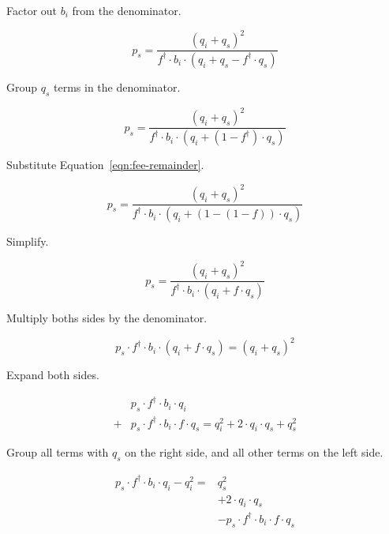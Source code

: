 Factor out $b_i$ from the denominator.

\begin{equation*}
  p_s = \frac{(q_i + q_s)^2}{f^{\dagger} \cdot b_i \cdot
  \left(q_i + q_s - f^{\dagger} \cdot q_s\right)}
\end{equation*}

Group $q_s$ terms in the denominator.

\begin{equation*}
  p_s = \frac{(q_i + q_s)^2}{f^{\dagger} \cdot b_i \cdot
  \left(q_i + (1 - f^{\dagger}) \cdot q_s \right)}
\end{equation*}

Substitute Equation~\ref{eqn:fee-remainder}.

\begin{equation*}
  p_s = \frac{(q_i + q_s)^2}{f^{\dagger} \cdot b_i \cdot
  \left(q_i + (1 - (1 - f)) \cdot q_s \right)}
\end{equation*}

Simplify.

\begin{equation*}
  p_s = \frac{(q_i + q_s)^2}{f^{\dagger} \cdot b_i \cdot
  \left(q_i + f \cdot q_s \right)}
\end{equation*}

Multiply boths sides by the denominator.

\begin{equation*}
  p_s \cdot f^{\dagger} \cdot b_i \cdot (q_i + f \cdot q_s) = {(q_i + q_s)}^2
\end{equation*}

Expand both sides.

\begin{equation}
	\begin{aligned}
		      & p_s \cdot f^{\dagger} \cdot b_i \cdot q_i           \\
		{}+{} & p_s \cdot f^{\dagger} \cdot b_i \cdot f \cdot q_s =
		q_i^2 + 2 \cdot q_i \cdot q_s + q_s^2
	\end{aligned} \nonumber
\end{equation}

Group all terms with $q_s$ on the right side, and all other terms on the left side.

\begin{equation*}
	\begin{aligned}
		p_s \cdot f^{\dagger} \cdot b_i \cdot q_i - q_i^ 2 ={}
		 & q_s^2                                           \\
		 & + 2 \cdot q_i \cdot q_s                         \\
		 & - p_s \cdot f^{\dagger} \cdot b_i \cdot f \cdot q_s
	\end{aligned}
\end{equation*}

